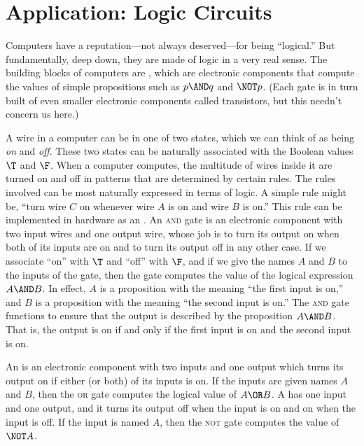 \section{Application: Logic Circuits}\label{S-logic-3}

Computers have a reputation---not always deserved---for being ``logical.''
But fundamentally, deep down, they are made of logic in a very real
sense.  The building blocks of computers are ,
which are electronic components that compute the values of simple
propositions such as $p\AND q$ and $\NOT p$.  (Each gate is in turn
built of even smaller electronic components called transistors,
but this needn't concern us here.)

A wire in a computer can be in one of two states, which we can
think of as being \emph{on} and \emph{off}.  These two states 
can be naturally associated with the Boolean values $\T$ and $\F$.
When a computer computes, the multitude of wires inside it are
turned on and off in patterns that are determined by certain rules.
The rules involved can be most naturally expressed in terms of logic.
A simple rule might be, ``turn wire $C$ on whenever wire $A$ is on
and wire $B$ is on.''  This rule can be implemented in hardware as
an .  An \textsc{and} gate is an electronic 
component with two input wires and one output wire, whose job is
to turn its output on when both of its inputs are on and to turn
its output off in any other case.  If we associate ``on'' with
$\T$ and ``off'' with $\F$, and if we give the names $A$ and $B$ to
the inputs of the gate, then the gate computes the value of the
logical expression $A\AND B$.  In effect, $A$ is a proposition
with the meaning ``the first input is on,'' and $B$ is a proposition
with the meaning ``the second input is on.''  The \textsc{and} gate
functions to ensure that the output is described by the 
proposition $A \AND B$.  That is, the output is on if and only if
the first input is on and the second input is on.

An  is an electronic component with two inputs
and one output which turns its output on if either (or both) of its
inputs is on.  If the inputs are given names $A$ and $B$, then
the \textsc{or} gate computes the logical value of $A\OR B$.
A  has one input and one output, and it turns
its output off when the input is on and on when the input is off.
If the input is named $A$, then the \textsc{not} gate computes the
value of $\NOT A$.

